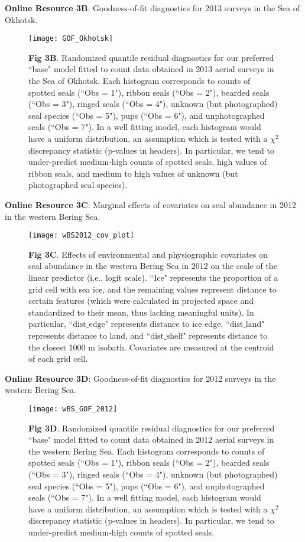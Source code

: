 \documentclass{svjour3}
\begin{document}
\pagebreak

\textbf{Online Resource 3B}: Goodness-of-fit diagnostics for 2013 surveys in the Sea of Okhotsk.
\begin{figure}[ht]
\centering
\texttt{[image: GOF\_Okhotsk]}
\caption{\textbf{Fig 3B}. Randomized quantile residual diagnostics for our preferred ``base" model fitted to count data obtained in 2013 aerial surveys in the Sea of Okhotsk.  Each histogram corresponds to counts of spotted seals (``Obs = 1"), ribbon seals (``Obs = 2"), bearded seals (``Obs = 3"), ringed seals (``Obs = 4"), unknown (but photographed) seal species (``Obs = 5"), pups (``Obs = 6"), and unphotographed seals (``Obs = 7").  In a well fitting model, each histogram would have a uniform distribution, an assumption which is tested with a $\chi^2$ discrepancy statistic (p-values in headers).  In particular, we tend to under-predict medium-high counts of spotted seals, high values of ribbon seals, and medium to high values of unknown (but photographed seal species).}
\label{fig:GOFo}
\end{figure}

\pagebreak


\textbf{Online Resource 3C}: Marginal effects of covariates on seal abundance in 2012 in the western Bering Sea.
\begin{figure}[ht]
\centering
\texttt{[image: wBS2012\_cov\_plot]}
\caption{\textbf{Fig 3C}. Effects of environmental and physiographic covariates on seal abundance in the western Bering Sea in 2012 on the scale of the linear predictor (i.e., logit scale). ``Ice" represents the proportion of a grid cell with sea ice, and the remaining values represent distance to certain features (which were calculated in projected space and standardized to their mean, thus lacking meaningful units).  In particular, ``$\text{dist}\_\text{edge}$" represents distance to ice edge, ``$\text{dist}\_\text{land}$" represents distance to land, and ``$\text{dist}\_\text{shelf}$" represents distance to the closest 1000 m isobath. Covariates are measured at the centroid of each grid cell.   }
\label{fig:covsWBS2012}
\end{figure}

\pagebreak

\textbf{Online Resource 3D}: Goodness-of-fit diagnostics for 2012 surveys in the western Bering Sea.
\begin{figure}[ht]
\centering
\texttt{[image: wBS\_GOF\_2012]}
\caption{\textbf{Fig 3D}. Randomized quantile residual diagnostics for our preferred ``base" model fitted to count data obtained in 2012 aerial surveys in the western Bering Sea.  Each histogram corresponds to counts of spotted seals (``Obs = 1"), ribbon seals (``Obs = 2"), bearded seals (``Obs = 3"), ringed seals (``Obs = 4"), unknown (but photographed) seal species (``Obs = 5"), pups (``Obs = 6"), and unphotographed seals (``Obs = 7").  In a well fitting model, each histogram would have a uniform distribution, an assumption which is tested with a $\chi^2$ discrepancy statistic (p-values in headers).  In particular, we tend to under-predict medium-high counts of spotted seals.}
\label{fig:GOFwBS2012}
\end{figure}
\end{document}
